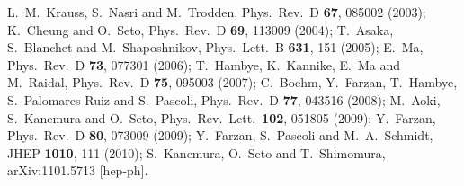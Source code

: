 \documentclass[aps,prd,preprint,nofootinbib]{revtex4}
\begin{document}
\begin{thebibliography}{99}
  L.~M.~Krauss, S.~Nasri and M.~Trodden,
  Phys.\ Rev.\  D {\bf 67}, 085002 (2003);
  K.~Cheung and O.~Seto,
  Phys.\ Rev.\  D {\bf 69}, 113009 (2004);
  T.~Asaka, S.~Blanchet and M.~Shaposhnikov,
  Phys.\ Lett.\  B {\bf 631}, 151 (2005);
  E.~Ma,
  Phys.\ Rev.\  D {\bf 73}, 077301 (2006);
  T.~Hambye, K.~Kannike, E.~Ma and M.~Raidal,
  Phys.\ Rev.\  D {\bf 75}, 095003 (2007);
  C.~Boehm, Y.~Farzan, T.~Hambye, S.~Palomares-Ruiz and S.~Pascoli,
  Phys.\ Rev.\  D {\bf 77}, 043516 (2008);
  M.~Aoki, S.~Kanemura and O.~Seto,
  Phys.\ Rev.\ Lett.\  {\bf 102}, 051805 (2009);
  Y.~Farzan,
  Phys.\ Rev.\  D {\bf 80}, 073009 (2009);
  Y.~Farzan, S.~Pascoli and M.~A.~Schmidt,
  JHEP {\bf 1010}, 111 (2010);
  S.~Kanemura, O.~Seto and T.~Shimomura,
  arXiv:1101.5713 [hep-ph].


\end{thebibliography}
\end{document}
